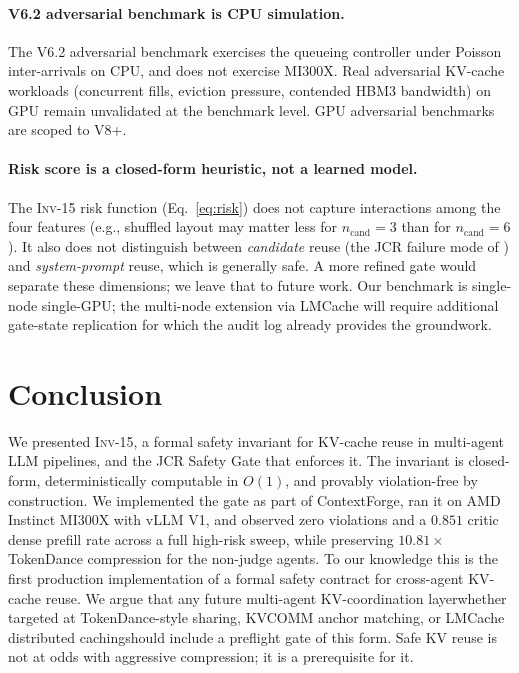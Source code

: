 \documentclass[10pt,twocolumn]{article}
\newcommand{\INV}[1]{\textsc{Inv-#1}}
\newcommand{\Cand}{n_{\text{cand}}}
\begin{document}
\paragraph{V6.2 adversarial benchmark is CPU simulation.}
The V6.2 adversarial benchmark exercises the queueing controller under
Poisson inter-arrivals on CPU, and does not exercise MI300X. Real
adversarial KV-cache workloads (concurrent fills, eviction pressure,
contended HBM3 bandwidth) on GPU remain unvalidated at the benchmark
level. GPU adversarial benchmarks are scoped to V8+.

\paragraph{Risk score is a closed-form heuristic, not a learned model.}
The \INV{15} risk function (Eq.~\ref{eq:risk}) does not capture
interactions among the four features (e.g., shuffled layout may matter
less for $\Cand = 3$ than for $\Cand = 6$). It also does not distinguish
between \emph{candidate} reuse (the JCR failure mode of
\cite{jcrfailure}) and \emph{system-prompt} reuse, which is generally
safe. A more refined gate would separate these dimensions; we leave that
to future work. Our benchmark is single-node single-GPU; the multi-node
extension via LMCache \cite{lmcache} will require additional gate-state
replication for which the audit log already provides the groundwork.

\section{Conclusion}
\label{sec:conclusion}

We presented \INV{15}, a formal safety invariant for KV-cache reuse in
multi-agent LLM pipelines, and the JCR Safety Gate that enforces it. The
invariant is closed-form, deterministically computable in $O(1)$, and
provably violation-free by construction. We implemented the gate as part
of ContextForge, ran it on AMD Instinct MI300X with vLLM V1, and observed
zero violations and a $0.851$ critic dense prefill rate across a full
high-risk sweep, while preserving $10.81\times$ TokenDance compression
for the non-judge agents. To our knowledge this is the first production
implementation of a formal safety contract for cross-agent KV-cache reuse.
We argue that any future multi-agent KV-coordination
layer\textemdash whether targeted at TokenDance-style sharing, KVCOMM
anchor matching, or LMCache distributed caching\textemdash should include
a preflight gate of this form. Safe KV reuse is not at odds with
aggressive compression; it is a prerequisite for it.
\end{document}
